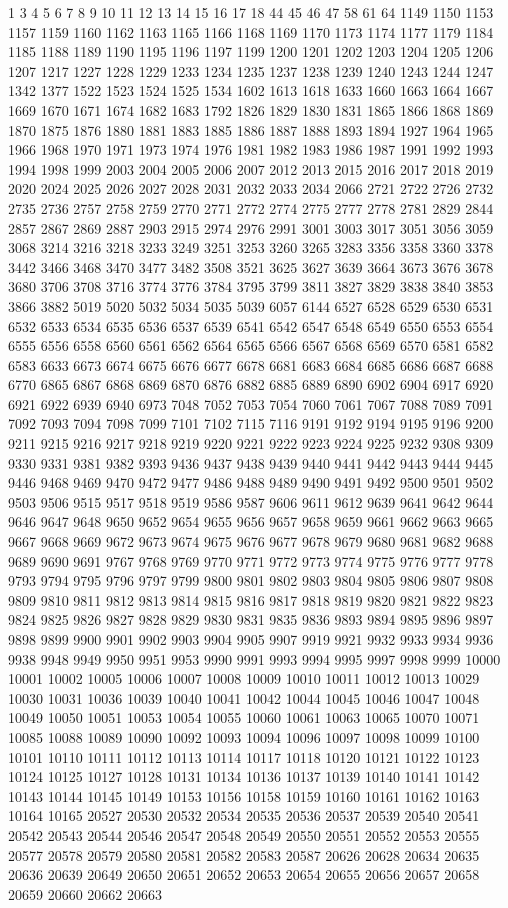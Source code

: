 1 3 4 5 6 7 8 9 10 11 12 13 14 15 16 17 18 44 45 46 47 58 61 64 1149 1150 1153 1157 1159 1160 1162 1163 1165 1166 1168 1169 1170 1173 1174 1177 1179 1184 1185 1188 1189 1190 1195 1196 1197 1199 1200 1201 1202 1203 1204 1205 1206 1207 1217 1227 1228 1229 1233 1234 1235 1237 1238 1239 1240 1243 1244 1247 1342 1377 1522 1523 1524 1525 1534 1602 1613 1618 1633 1660 1663 1664 1667 1669 1670 1671 1674 1682 1683 1792 1826 1829 1830 1831 1865 1866 1868 1869 1870 1875 1876 1880 1881 1883 1885 1886 1887 1888 1893 1894 1927 1964 1965 1966 1968 1970 1971 1973 1974 1976 1981 1982 1983 1986 1987 1991 1992 1993 1994 1998 1999 2003 2004 2005 2006 2007 2012 2013 2015 2016 2017 2018 2019 2020 2024 2025 2026 2027 2028 2031 2032 2033 2034 2066 2721 2722 2726 2732 2735 2736 2757 2758 2759 2770 2771 2772 2774 2775 2777 2778 2781 2829 2844 2857 2867 2869 2887 2903 2915 2974 2976 2991 3001 3003 3017 3051 3056 3059 3068 3214 3216 3218 3233 3249 3251 3253 3260 3265 3283 3356 3358 3360 3378 3442 3466 3468 3470 3477 3482 3508 3521 3625 3627 3639 3664 3673 3676 3678 3680 3706 3708 3716 3774 3776 3784 3795 3799 3811 3827 3829 3838 3840 3853 3866 3882 5019 5020 5032 5034 5035 5039 6057 6144 6527 6528 6529 6530 6531 6532 6533 6534 6535 6536 6537 6539 6541 6542 6547 6548 6549 6550 6553 6554 6555 6556 6558 6560 6561 6562 6564 6565 6566 6567 6568 6569 6570 6581 6582 6583 6633 6673 6674 6675 6676 6677 6678 6681 6683 6684 6685 6686 6687 6688 6770 6865 6867 6868 6869 6870 6876 6882 6885 6889 6890 6902 6904 6917 6920 6921 6922 6939 6940 6973 7048 7052 7053 7054 7060 7061 7067 7088 7089 7091 7092 7093 7094 7098 7099 7101 7102 7115 7116 9191 9192 9194 9195 9196 9200 9211 9215 9216 9217 9218 9219 9220 9221 9222 9223 9224 9225 9232 9308 9309 9330 9331 9381 9382 9393 9436 9437 9438 9439 9440 9441 9442 9443 9444 9445 9446 9468 9469 9470 9472 9477 9486 9488 9489 9490 9491 9492 9500 9501 9502 9503 9506 9515 9517 9518 9519 9586 9587 9606 9611 9612 9639 9641 9642 9644 9646 9647 9648 9650 9652 9654 9655 9656 9657 9658 9659 9661 9662 9663 9665 9667 9668 9669 9672 9673 9674 9675 9676 9677 9678 9679 9680 9681 9682 9688 9689 9690 9691 9767 9768 9769 9770 9771 9772 9773 9774 9775 9776 9777 9778 9793 9794 9795 9796 9797 9799 9800 9801 9802 9803 9804 9805 9806 9807 9808 9809 9810 9811 9812 9813 9814 9815 9816 9817 9818 9819 9820 9821 9822 9823 9824 9825 9826 9827 9828 9829 9830 9831 9835 9836 9893 9894 9895 9896 9897 9898 9899 9900 9901 9902 9903 9904 9905 9907 9919 9921 9932 9933 9934 9936 9938 9948 9949 9950 9951 9953 9990 9991 9993 9994 9995 9997 9998 9999 10000 10001 10002 10005 10006 10007 10008 10009 10010 10011 10012 10013 10029 10030 10031 10036 10039 10040 10041 10042 10044 10045 10046 10047 10048 10049 10050 10051 10053 10054 10055 10060 10061 10063 10065 10070 10071 10085 10088 10089 10090 10092 10093 10094 10096 10097 10098 10099 10100 10101 10110 10111 10112 10113 10114 10117 10118 10120 10121 10122 10123 10124 10125 10127 10128 10131 10134 10136 10137 10139 10140 10141 10142 10143 10144 10145 10149 10153 10156 10158 10159 10160 10161 10162 10163 10164 10165 20527 20530 20532 20534 20535 20536 20537 20539 20540 20541 20542 20543 20544 20546 20547 20548 20549 20550 20551 20552 20553 20555 20577 20578 20579 20580 20581 20582 20583 20587 20626 20628 20634 20635 20636 20639 20649 20650 20651 20652 20653 20654 20655 20656 20657 20658 20659 20660 20662 20663